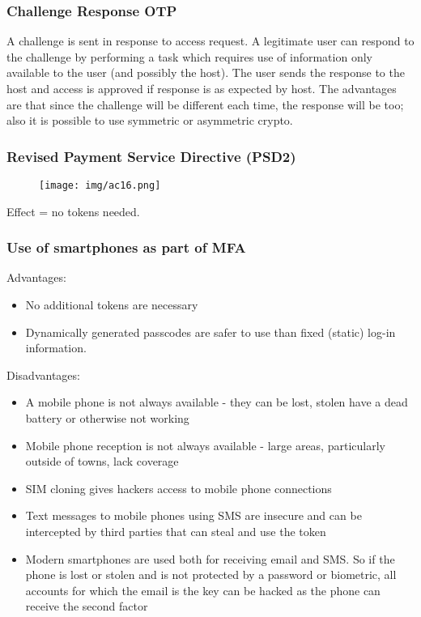 \documentclass[a4paper, 10pt, titlepage]{article}
\begin{document}
\subsubsection{Challenge Response OTP}
A challenge is sent in response to access request. A legitimate user can respond to the challenge by performing a task which requires use of information only available to the user (and possibly the host). The user sends the response to the host and access is approved if response is as expected by host. The advantages are that since the challenge will be different each time, the response will be too; also it is possible to use symmetric or asymmetric crypto.

\subsubsection{Revised Payment Service Directive (PSD2)}
\begin{figure}[h]
\centering
\texttt{[image: img/ac16.png]}
\end{figure}
Effect = no tokens needed.

\subsubsection{Use of smartphones as part of MFA}
Advantages:
\begin{itemize}
\item No additional tokens are necessary
\item Dynamically generated passcodes are safer to use than fixed (static) log-in information.
\end{itemize}
Disadvantages:
\begin{itemize}
\item A mobile phone is not always available - they can be lost, stolen have a dead battery or otherwise not working
\item Mobile phone reception is not always available - large areas, particularly outside of towns, lack coverage
\item SIM cloning gives hackers access to mobile phone connections
\item Text messages to mobile phones using SMS are insecure and can be intercepted by third parties that can steal and use the token
\item Modern smartphones are used both for receiving email and SMS. So if the phone is lost or stolen and is not protected by a password or biometric, all accounts for which the email is the key can be hacked as the phone can receive the second factor
\end{itemize}
\end{document}
